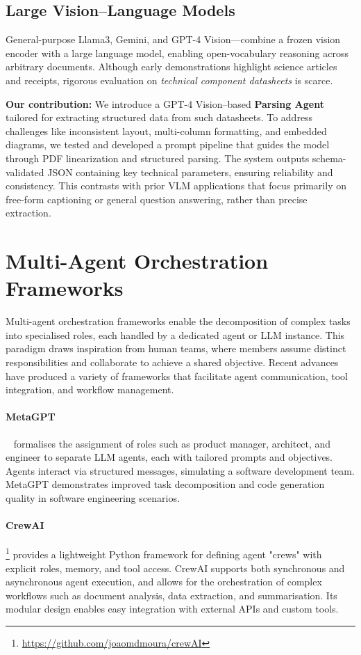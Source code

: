 \subsection{Large Vision--Language Models}
General-purpose Llama3, Gemini, and GPT-4 Vision—combine a frozen vision
encoder with a large language model, enabling open-vocabulary reasoning across
arbitrary documents.
Although early demonstrations highlight science articles and receipts,
rigorous evaluation on \emph{technical component datasheets} is scarce.

\textbf{Our contribution:} We introduce a GPT-4 Vision–based \textbf{Parsing Agent} tailored for extracting structured data from such datasheets. To address challenges like inconsistent layout, multi-column formatting, and embedded diagrams, we tested and developed a prompt pipeline that guides the model through PDF linearization and structured parsing. The system outputs schema-validated JSON containing key technical parameters, ensuring reliability and consistency. This contrasts with prior VLM applications that focus primarily on free-form captioning or general question answering, rather than precise extraction.

\section{Multi-Agent Orchestration Frameworks}
Multi-agent orchestration frameworks enable the decomposition of complex tasks into specialised roles, each handled by a dedicated agent or LLM instance. This paradigm draws inspiration from human teams, where members assume distinct responsibilities and collaborate to achieve a shared objective. Recent advances have produced a variety of frameworks that facilitate agent communication, tool integration, and workflow management.

\paragraph{MetaGPT}~\cite{hong2023metagpt} formalises the assignment of roles such as product manager, architect, and engineer to separate LLM agents, each with tailored prompts and objectives. Agents interact via structured messages, simulating a software development team. MetaGPT demonstrates improved task decomposition and code generation quality in software engineering scenarios.

\paragraph{CrewAI}\footnote{\url{https://github.com/joaomdmoura/crewAI}} provides a lightweight Python framework for defining agent "crews" with explicit roles, memory, and tool access. CrewAI supports both synchronous and asynchronous agent execution, and allows for the orchestration of complex workflows such as document analysis, data extraction, and summarisation. Its modular design enables easy integration with external APIs and custom tools.

